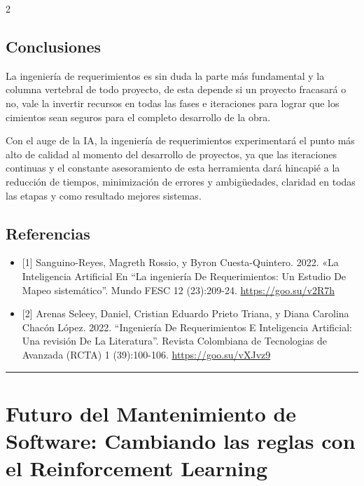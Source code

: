 \documentclass[12pt,spanish,Letterpaper,openany]{book}
\newcommand{\HRule}{\begin{center}\rule{0.5\linewidth}{0.2mm}\end{center}}
\begin{document}
\begin {multicols}{2}
{\section{Conclusiones}\label{conclusiones-8}}

La ingeniería de requerimientos es sin duda la parte más fundamental y la columna vertebral de todo proyecto, de esta depende si un proyecto fracasará o no, vale la invertir recursos en todas las fases e iteraciones para lograr que los cimientos sean seguros para el completo desarrollo de la obra.

Con el auge de la IA, la ingeniería de requerimientos experimentará el punto más alto de calidad al momento del desarrollo de proyectos, ya que las iteraciones continuas y el constante asesoramiento de esta herramienta dará hincapié a la reducción de tiempos, minimización de errores y ambigüedades, claridad en todas las etapas y como resultado mejores sistemas.

\hypertarget{referencias-7}{%
\section{Referencias}\label{referencias-7}}

\begin{itemize}
\item
  {[}1{]} Sanguino-Reyes, Magreth Rossio, y Byron Cuesta-Quintero. 2022. «La Inteligencia Artificial En ``La ingeniería De Requerimientos: Un Estudio De Mapeo sistemático''. Mundo FESC 12 (23):209-24. \url{https://goo.su/v2R7h}
\item
  {[}2{]} Arenas Seleey, Daniel, Cristian Eduardo Prieto Triana, y Diana Carolina Chacón López. 2022. ``Ingeniería De Requerimientos E Inteligencia Artificial: Una revisión De La Literatura''. Revista Colombiana de Tecnologias de Avanzada (RCTA) 1 (39):100-106. \url{https://goo.su/vXJvz9}
\end{itemize}

\end {multicols}

\medskip

\HRule

\medskip

\hypertarget{pareja55}{%
\chapter{Futuro del Mantenimiento de Software: Cambiando las reglas con el Reinforcement Learning}\label{pareja55}}
\end{document}
